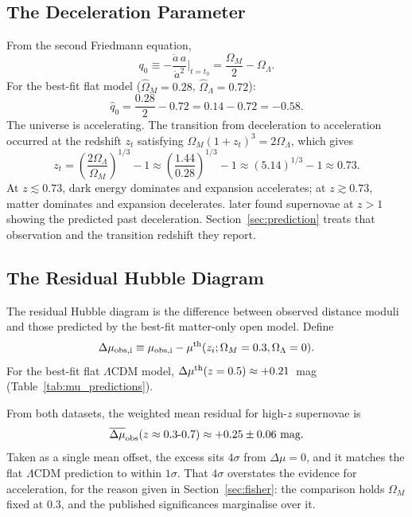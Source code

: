 \documentclass[12pt]{article}
\begin{document}
\subsection{The Deceleration Parameter}

From the second Friedmann equation,
\begin{equation}\label{eq:q0}
  q_0 \equiv -\frac{\ddot a\,a}{\dot a^2}\bigg|_{t=t_0}
  = \frac{\Omega_M}{2} - \Omega_\Lambda.
\end{equation}
For the best-fit flat model ($\hat\Omega_M = 0.28$,
$\hat\Omega_\Lambda = 0.72$):
\begin{equation}\label{eq:q0_num}
  \hat q_0 = \frac{0.28}{2} - 0.72 = 0.14 - 0.72 = \mathbf{-0.58}.
\end{equation}
The universe is accelerating.  The transition from deceleration to
acceleration occurred at the redshift $z_t$ satisfying
$\Omega_M(1+z_t)^3 = 2\Omega_\Lambda$, which gives
\begin{equation}\label{eq:zt}
  z_t = \left(\frac{2\Omega_\Lambda}{\Omega_M}\right)^{1/3} - 1
  \approx \left(\frac{1.44}{0.28}\right)^{1/3} - 1
  \approx (5.14)^{1/3} - 1 \approx 0.73.
\end{equation}
At $z \lesssim 0.73$, dark energy dominates and expansion accelerates;
at $z \gtrsim 0.73$, matter dominates and expansion decelerates.
\citet{Riess2004} later found supernovae at $z > 1$ showing the predicted
past deceleration.  Section~\ref{sec:prediction} treats that observation and
the transition redshift they report.

\subsection{The Residual Hubble Diagram}

The residual Hubble diagram is the difference between observed distance
moduli and those predicted by the best-fit matter-only open model.  Define
\begin{equation}\label{eq:Deltamu}
  \Delta\mu_{\rm obs,i} \equiv
  \mu_{\rm obs,i} - \mu^{\rm th}(z_i;\Omega_M=0.3, \Omega_\Lambda=0).
\end{equation}
For the best-fit flat $\Lambda$CDM model,
$\Delta\mu^{\rm th}(z=0.5) \approx +0.21$~mag (Table~\ref{tab:mu_predictions}).

From both datasets, the weighted mean residual for high-$z$ supernovae
is
\begin{equation}\label{eq:Deltamu_obs}
  \overline{\Delta\mu}_{\rm obs}(z\approx0.3\text{-}0.7)
  \approx +0.25 \pm 0.06~\text{mag}.
\end{equation}
Taken as a single mean offset, the excess sits $4\sigma$ from
$\Delta\mu = 0$, and it matches the flat $\Lambda$CDM prediction to within
$1\sigma$.  That $4\sigma$ overstates the evidence for acceleration, for the
reason given in Section~\ref{sec:fisher}: the comparison holds $\Omega_M$
fixed at $0.3$, and the published significances marginalise over it.
\end{document}
